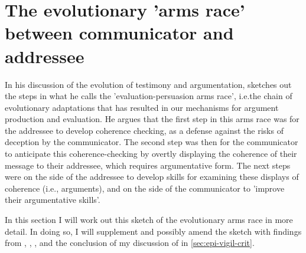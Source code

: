 

\section{The evolutionary 'arms race' between communicator and addressee}
\label{sec:arms-race}

In his discussion of the evolution of testimony and argumentation,\citet{Sperber01} sketches out the steps in what he calls the 'evaluation-persuasion arms race', i.e.\@ the chain of evolutionary adaptations that has resulted in our mechanisms for argument production and evaluation.
He argues that the first step in this arms race was for the addressee to develop coherence checking, as a defense against the risks of deception by the communicator. The second step was then for the communicator to anticipate this coherence-checking by overtly displaying the coherence of their message to their addressee, which requires argumentative form. The next steps were on the side of the addressee to develop skills for examining these displays of coherence (i.e., arguments), and on the side of the communicator to 'improve their argumentative skills'.

In this section I will work out this sketch of the evolutionary arms race in more detail. In doing so, I will supplement and possibly amend the sketch with findings from \citet{Sperber10}, \citet{MS11}, \citet{Reboul17}, and the conclusion of my discussion of \citet{Michaelian13} in \cref{sec:epi-vigil-crit}.

